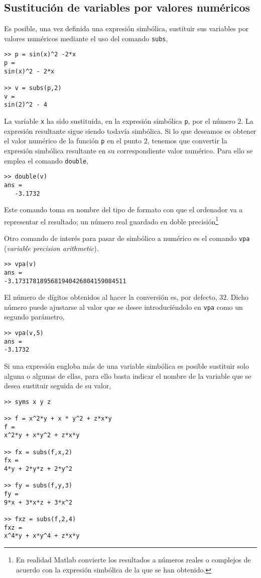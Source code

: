 \subsection{Sustitución de variables por valores numéricos}
Es posible, una vez definida una expresión simbólica, sustituir sus variables por valores numéricos mediante el uso del comando \texttt{subs},

\begin{verbatim}
>> p = sin(x)^2 -2*x 
p = 
sin(x)^2 - 2*x
 
>> v = subs(p,2) 
v = 
sin(2)^2 - 4
\end{verbatim}

La variable \texttt{x} ha sido sustituida, en la expresión simbólica \texttt{p}, por el número $2$. La expresión resultante sigue siendo todavía simbólica.
Si lo que deseamos es obtener el valor numérico  de la función \texttt{p} en el punto $2$, tenemos que convertir la expresión simbólica resultante en su correspondiente valor numérico. Para ello se emplea el comando \texttt{double},

\begin{verbatim}
>> double(v)
ans =
   -3.1732
\end{verbatim}
Este comando toma su nombre del tipo de formato con que el ordenador va a representar el resultado; un número real guardado en doble precisión\footnote{En realidad Matlab convierte los resultados a números reales o complejos de acuerdo con la expresión simbólica de la que se han obtenido.}

Otro comando de interés para pasar de simbólico a numérico es el comando \texttt{vpa} (\emph{variable precision arithmetic}).
\begin{verbatim}
>> vpa(v) 
ans = 
-3.1731781895681940426804159084511
\end{verbatim}
El número de dígitos obtenidos al hacer la conversión es, por defecto, $32$. Dicho número puede ajustarse al 
valor que se desee introduciéndolo en \texttt{vpa} como un segundo parámetro,

\begin{verbatim}
>> vpa(v,5) 
ans = 
-3.1732
\end{verbatim}

Si una expresión engloba más  de una variable simbólica es posible sustituir solo alguna o algunas de ellas, para ello basta indicar el nombre de la variable que se desea sustituir seguida de su valor,
\begin{verbatim}
>> syms x y z

>> f = x^2*y + x * y^2 + z*x*y 
f = 
x^2*y + x*y^2 + z*x*y
 
>> fx = subs(f,x,2) 
fx = 
4*y + 2*y*z + 2*y^2
 
>> fy = subs(f,y,3) 
fy = 
9*x + 3*x*z + 3*x^2
 
>> fxz = subs(f,2,4) 
fxz = 
x^4*y + x*y^4 + z*x*y
\end{verbatim}
 
